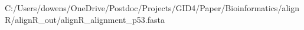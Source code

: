 \documentclass[preview]{standalone}
\begin{document}
\begin{texshade}{C:/Users/dowens/OneDrive/Postdoc/Projects/GID4/Paper/Bioinformatics/alignR/alignR_out/alignR_alignment_p53.fasta}
\showlegend
\movelegend{0cm}{0cm}
\namesfootnotesize
\residuesfootnotesize
\legendfootnotesize
\numberingtiny
\end{texshade}
\end{document}
